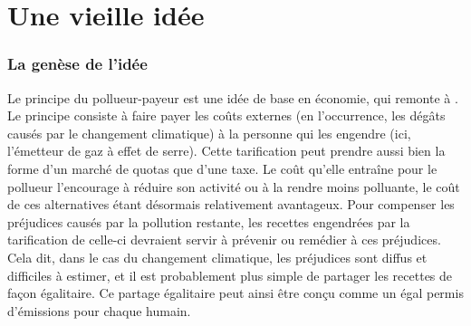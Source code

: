\documentclass[a5paper,french,openany]{memoir}
\begin{document}
\section{Une vieille idée} 

\subsubsection{La genèse de l'idée}
Le principe du pollueur-payeur est une idée de base en économie, qui remonte à \citet{pigou_economics_1920}. Le principe consiste à faire payer les coûts externes (en l'occurrence, les dégâts causés par le changement climatique) à la personne qui les engendre (ici, l'émetteur de gaz à effet de serre). Cette tarification peut prendre aussi bien la forme d'un marché de quotas que d'une taxe. Le coût qu'elle entraîne pour le pollueur l'encourage à réduire son activité ou à la rendre moins polluante, le coût de ces alternatives étant désormais relativement avantageux. 
Pour compenser les préjudices causés par la pollution restante, les recettes engendrées par la tarification de celle-ci devraient servir à prévenir ou remédier à ces préjudices. 
Cela dit, dans le cas du changement climatique, les préjudices sont diffus et difficiles à estimer, et il est probablement plus simple de partager les recettes de façon égalitaire. Ce partage égalitaire peut ainsi être conçu comme un égal permis d'émissions pour chaque humain. 
\end{document}
